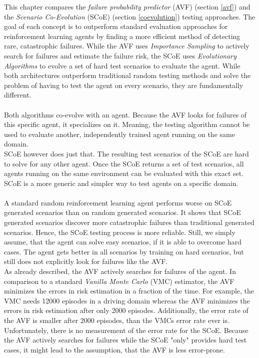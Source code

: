 This chapter compares the \textit{failure probability predictor} (AVF) (section \ref{avf}) and the \textit{Scenario Co-Evolution} (SCoE) (section \ref{coevolution}) testing approaches. The goal of each concept is to outperform standard evaluation approaches for reinforcement learning agents by finding a more efficient method of detecting rare, catastrophic failures. While the AVF uses \textit{Importance Sampling} to actively search for failures and estimate the failure risk, the SCoE uses \textit{Evolutionary Algorithms} to evolve a set of hard test scenarios to evaluate the agent. While both architectures outperform traditional random testing methods and solve the problem of having to test the agent on every scenario, they are fundamentally different.\\\\
Both algorithms co-evolve with an agent. Because the AVF looks for failures of this specific agent, it specializes on it. Meaning, the testing algorithm cannot be used to evaluate another, independently trained agent running on the same domain.\\
SCoE however does just that. The resulting test scenarios of the SCoE are hard to solve for any other agent. Once the SCoE returns a set of test scenarios, all agents running on the same environment can be evaluated with this exact set. SCoE is a more generic and simpler way to test agents on a specific domain.\\\\
A standard random reinforcement learning agent performs worse on SCoE generated scenarios than on random generated scenarios. It shows that SCoE generated scenarios discover more catastrophic failures than traditional generated scenarios. Hence, the SCoE testing process is more reliable. Still, we simply assume, that the agent can solve easy scenarios, if it is able to overcome hard cases. The agent gets better in all scenarios by training on hard scenarios, but still does not explicitly look for failures like the AVF.\\
As already described, the AVF actively searches for failures of the agent. In comparison to a standard \textit{Vanilla Monte Carlo} (VMC) estimator, the AVF minimizes the errors in risk estimation in a fraction of the time. For example, the VMC needs 12000 episodes in a driving domain whereas the AVF minimizes the errors in risk estimation after only 2000 episodes. Additionally, the error rate of the AVF is smaller after 2000 episodes, than the VMCs error rate ever is. Unfortunately, there is no measurement of the error rate for the SCoE. Because the AVF actively searches for failures while the SCoE "only" provides hard test cases, it might lead to the assumption, that the AVF is less error-prone.\\
